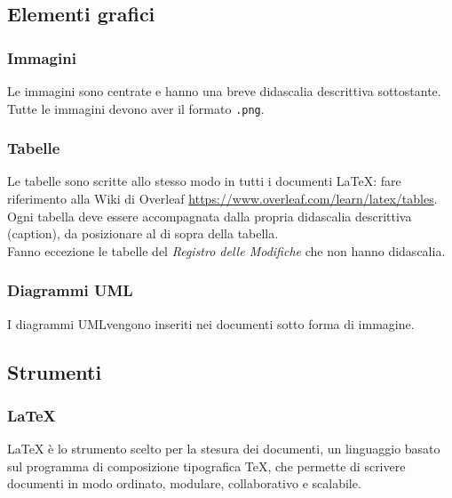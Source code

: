 \subsection{Elementi grafici}
\subsubsection{Immagini}
Le immagini sono centrate e hanno una breve didascalia descrittiva sottostante. Tutte le immagini devono aver il formato \texttt{.png}\glo.

\subsubsection{Tabelle}
Le tabelle sono scritte allo stesso modo in tutti i documenti \LaTeX{}: fare riferimento alla Wiki di Overleaf \url{https://www.overleaf.com/learn/latex/tables}. \\
Ogni tabella deve essere accompagnata dalla propria didascalia descrittiva (caption), da posizionare al di sopra della tabella. \\
Fanno eccezione le tabelle del \textit{Registro delle Modifiche} che non hanno didascalia.

\subsubsection{Diagrammi UML}
I diagrammi UML\glo vengono inseriti nei documenti sotto forma di immagine.

\subsection{Strumenti}
\subsubsection{\LaTeX{}}
\LaTeX{} è lo strumento scelto per la stesura dei documenti, un linguaggio basato sul programma di composizione tipografica \TeX{}, che permette di scrivere documenti in modo ordinato, modulare, collaborativo e scalabile.

